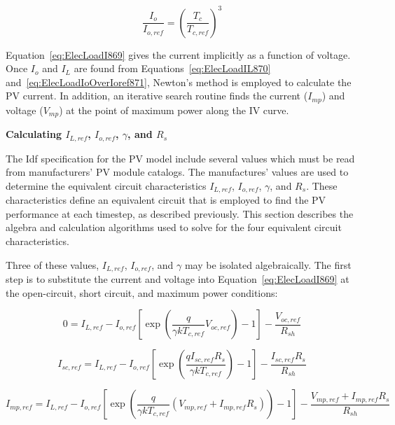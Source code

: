 \begin{equation}
\frac{{{I_o}}}{{{I_{o,ref}}}} = {\left( {\frac{{{T_c}}}{{{T_{c,ref}}}}} \right)^3}
\label{eq:ElecLoadIoOverIoref871}
\end{equation}

Equation~\ref{eq:ElecLoadI869} gives the current implicitly as a function of voltage. Once \(I_{o}\) and \(I_{L}\) are found from Equations~\ref{eq:ElecLoadIL870} and~\ref{eq:ElecLoadIoOverIoref871}, Newton's method is employed to calculate the PV current. In addition, an iterative search routine finds the current (\(I_{mp}\)) and voltage (\(V_{mp}\)) at the point of maximum power along the IV curve.

\textbf{Calculating \(I_{L,ref}\), \(I_{o,ref}\), \(\gamma\), and \(R_{s}\)}

The Idf specification for the PV model include several values which must be read from manufacturers' PV module catalogs. The manufactures' values are used to determine the equivalent circuit characteristics \(I_{L,ref}\), \(I_{o,ref}\), \(\gamma\), and \(R_{s}\). These characteristics define an equivalent circuit that is employed to find the PV performance at each timestep, as described previously. This section describes the algebra and calculation algorithms used to solve for the four equivalent circuit characteristics.

Three of these values, \(I_{L,ref}\), \(I_{o,ref}\), and \(\gamma\) may be isolated algebraically. The first step is to substitute the current and voltage into Equation~\ref{eq:ElecLoadI869} at the open-circuit, short circuit, and maximum power conditions:

\begin{equation}
0 = {I_{L,ref}} - {I_{o,ref}}\left[ {\exp \left( {\frac{q}{{\gamma k{T_{c,ref}}}}{V_{oc,ref}}} \right) - 1} \right] - \frac{{{V_{oc,ref}}}}{{{R_{sh}}}}
\end{equation}

\begin{equation}
{I_{sc,ref}} = {I_{L,ref}} - {I_{o,ref}}\left[ {\exp \left( {\frac{{q{I_{sc,ref}}{R_s}}}{{\gamma k{T_{c,ref}}}}} \right) - 1} \right] - \frac{{{I_{sc,ref}}{R_s}}}{{{R_{sh}}}}
\end{equation}

\begin{equation}
{I_{mp,ref}} = {I_{L,ref}} - {I_{o,ref}}\left[ {\exp \left( {\frac{q}{{\gamma k{T_{c,ref}}}}\left( {{V_{mp,ref}} + {I_{mp,ref}}{R_s}} \right)} \right) - 1} \right] - \frac{{{V_{mp,ref}} + {I_{mp,ref}}{R_s}}}{{{R_{sh}}}}
\end{equation}

